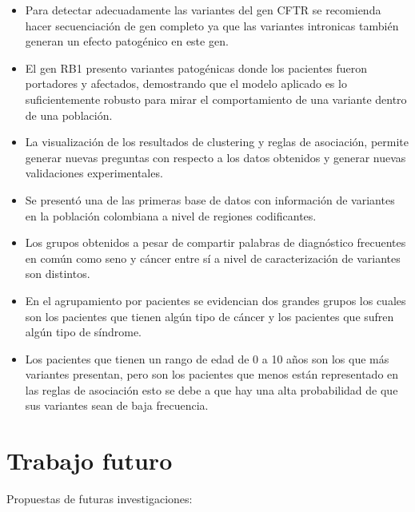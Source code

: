\begin{itemize}
	\item Para detectar adecuadamente las variantes del gen CFTR se recomienda hacer secuenciación de gen completo ya que las variantes intronicas también generan un efecto patogénico en este gen.
	
	\item El gen RB1 presento variantes patogénicas donde los pacientes fueron portadores y afectados, demostrando que el modelo aplicado es lo suficientemente robusto para mirar el comportamiento de una variante dentro de una población.
	
	\item La visualización de los resultados de clustering y reglas de asociación, permite generar nuevas preguntas con respecto a los datos obtenidos y generar nuevas validaciones experimentales.
	
	\item Se presentó una de las primeras base de datos con información de variantes en la población colombiana a nivel de regiones codificantes.
	
	\item Los grupos obtenidos a pesar de compartir palabras de diagnóstico frecuentes en común como seno y cáncer entre sí a nivel de caracterización de variantes son distintos.
	
	\item En el agrupamiento por pacientes se evidencian dos grandes grupos los cuales son los pacientes que tienen algún tipo de cáncer y los pacientes que sufren algún tipo de síndrome. 
	
	\item Los pacientes que tienen un rango de edad de 0 a 10 años son los que más variantes presentan, pero son los pacientes que menos están representado en las reglas de asociación esto se debe a que hay una alta probabilidad de que sus variantes sean de baja frecuencia. 
	
	
	 
\end{itemize}

\section{Trabajo futuro}

Propuestas de futuras investigaciones:

